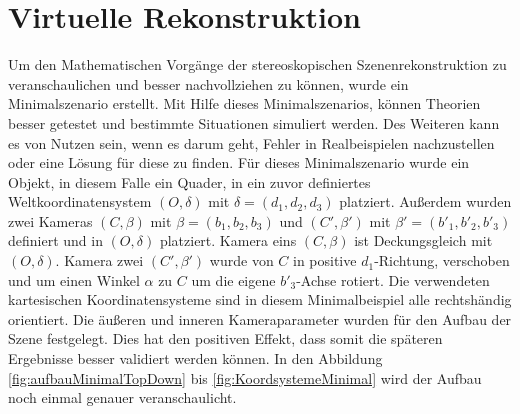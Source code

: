 \chapter{Virtuelle Rekonstruktion}
\label{sec:minimal} 


Um den Mathematischen Vorgänge der stereoskopischen Szenenrekonstruktion zu veranschaulichen und besser nachvollziehen zu können, wurde ein Minimalszenario erstellt. Mit Hilfe dieses Minimalszenarios, können Theorien besser getestet und bestimmte Situationen simuliert werden. Des Weiteren kann es von Nutzen sein, wenn es darum geht, Fehler in Realbeispielen nachzustellen oder eine Lösung für diese zu finden. Für dieses Minimalszenario wurde ein Objekt, in diesem Falle ein Quader, in ein zuvor definiertes Weltkoordinatensystem $(O,\delta)$ mit $\delta = (d_1,d_2,d_3)$ platziert. Außerdem wurden zwei Kameras $(C,\beta)$ mit $\beta = (b_1,b_2,b_3)$ und $(C',\beta')$ mit $\beta' = (b'_1,b'_2,b'_3)$ definiert und in $(O,\delta)$ platziert. Kamera eins $(C,\beta)$ ist Deckungsgleich mit $(O,\delta)$. Kamera zwei $(C',\beta')$ wurde von $C$ in positive $d_1$-Richtung, verschoben und um einen Winkel $\alpha$ zu $C$ um die eigene $b'_3$-Achse rotiert. Die verwendeten kartesischen Koordinatensysteme sind in diesem Minimalbeispiel alle rechtshändig orientiert. Die äußeren und inneren Kameraparameter wurden für den Aufbau der Szene festgelegt. Dies hat den positiven Effekt, dass somit die späteren Ergebnisse besser validiert werden können. In den Abbildung \ref{fig:aufbauMinimalTopDown} bis \ref{fig:KoordsystemeMinimal} wird der Aufbau noch einmal genauer veranschaulicht. \\

